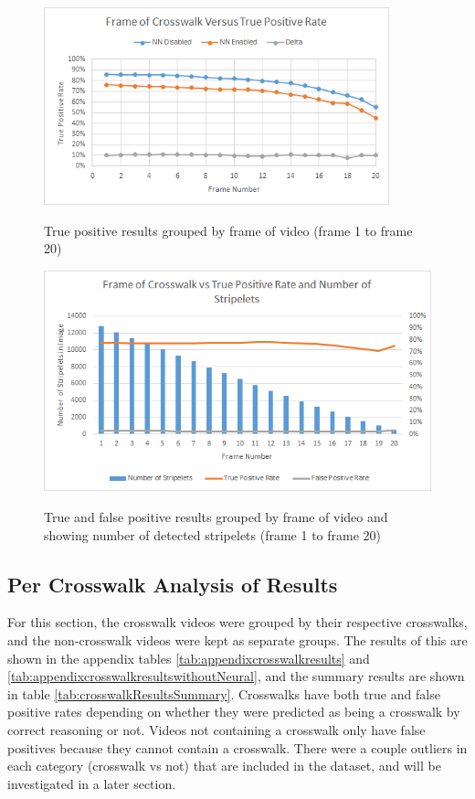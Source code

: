 \documentclass[12pt]{ucthesis}
\newcommand{\captionfonts}{\small\bf\ssp}
\begin{document}
\begin{figure}[t]
\begin{center}
\includegraphics[width=10cm]{FrameResultsGraph.png}
\captionfonts
\caption[Neural Network True Positives Grouped by Frame of Video]{True positive results grouped by frame of video (frame 1 to frame 20)}
\label{fig:graphOfFrameCount}
\end{center}
\end{figure}

\begin{figure}[t]
\begin{center}
\includegraphics[width=12cm]{NumStripeletsvsRates.png}
\captionfonts
\caption[True and False Positives Grouped by Frame of Video and Number of Stripelets]{True and false positive results grouped by frame of video and showing number of detected stripelets (frame 1 to frame 20)}
\label{fig:NumStripeletsvsRates}
\end{center}
\end{figure}

\clearpage

\subsection{Per Crosswalk Analysis of Results}

For this section, the crosswalk videos were grouped by their respective crosswalks, and the non-crosswalk videos were kept as separate groups. The results of this are shown in the appendix tables \ref{tab:appendixcrosswalkresults} and \ref{tab:appendixcrosswalkresultswithoutNeural}, and the summary results are shown in table \ref{tab:crosswalkResultsSummary}. Crosswalks have both true and false positive rates depending on whether they were predicted as being a crosswalk by correct reasoning or not. Videos not containing a crosswalk only have false positives because they cannot contain a crosswalk.  There were a couple outliers in each category (crosswalk vs not) that are included in the dataset, and will be investigated in a later section.
\end{document}
